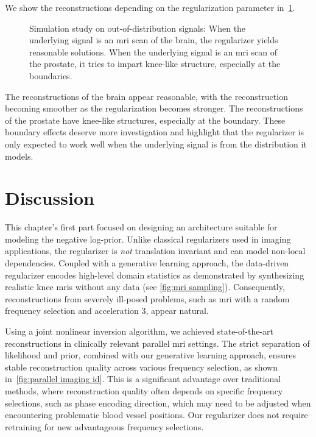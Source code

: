 We show the reconstructions depending on the regularization parameter in~\cref{fig:brain prostate recos}.
\begin{figure}
	\centering
	\caption[Simulation study on out-of-distribution signals]{%
		Simulation study on out-of-distribution signals:
		When the underlying signal is an \gls{mri} scan of the brain, the regularizer yields reasonable solutions.
		When the underlying signal is an \gls{mri} scan of the prostate, it tries to impart knee-like structure, especially at the boundaries.
	}%
	\label{fig:brain prostate recos}
\end{figure}
The reconstructions of the brain appear reasonable, with the reconstruction becoming smoother as the regularization becomes stronger.
The reconstructions of the prostate have knee-like structures, especially at the boundary.
These boundary effects deserve more investigation and highlight that the regularizer is only expected to work well when the underlying signal is from the distribution it models.
\section{Discussion}%
\label{sec:discussion}
This chapter's first part focused on designing an architecture suitable for modeling the negative log-prior.
Unlike classical regularizers used in imaging applications, the regularizer is \emph{not} translation invariant and can model non-local dependencies.
Coupled with a generative learning approach, the data-driven regularizer encodes high-level domain statistics as demonstrated by synthesizing realistic knee \glspl{mri} without any data (see \cref{fig:mri sampling}).
Consequently, reconstructions from severely ill-posed problems, such as \gls{mri} with a random frequency selection and acceleration \num{3}, appear natural.

Using a joint nonlinear inversion algorithm, we achieved state-of-the-art reconstructions in clinically relevant parallel \gls{mri} settings.
The strict separation of likelihood and prior, combined with our generative learning approach, ensures stable reconstruction quality across various frequency selection, as shown in~\cref{fig:parallel imaging id}.
This is a significant advantage over traditional methods, where reconstruction quality often depends on specific frequency selections, such as phase encoding direction, which may need to be adjusted when encountering problematic blood vessel positions.
Our regularizer does not require retraining for new advantageous frequency selections.

